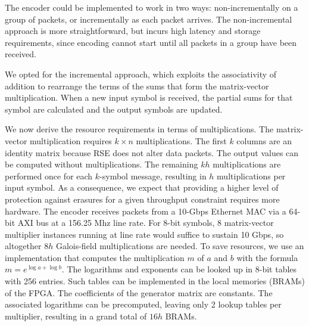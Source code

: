The encoder could be implemented to work in two ways:
non-incrementally on a group of packets, or incrementally as each
packet arrives. The non-incremental approach is more straightforward,
but incurs high latency and storage requirements, since  encoding
cannot start until all packets in a group have been received.

We opted for the incremental approach, which exploits the associativity of addition to
rearrange the terms of the sums that form the matrix-vector multiplication.
When a new input symbol is received, the partial sums for that symbol are
calculated and the output symbols are updated.

We now derive the resource requirements in terms of multiplications.
The matrix-vector multiplication requires $k \times n$
multiplications. %
The first $k$ columns are an identity matrix because RSE does not alter data
packets.  The output values can be computed without multiplications.  The
remaining $kh$ multiplications are performed once for each $k$-symbol message,
resulting in $h$ multiplications per input symbol.  As a consequence, we expect that
providing a higher level of protection against erasures for a given throughput
constraint requires more hardware.  The encoder receives
packets from a 10-Gbps Ethernet MAC via a 64-bit AXI bus at a 156.25 Mhz line
rate.  For 8-bit symbols, 8 matrix-vector multiplier instances running at
line rate would suffice to sustain 10 Gbps, so altogether $8h$ Galois-field multiplications
are needed.  To save resources, we use an implementation that computes the
multiplication $m$ of $a$ and $b$ with the formula $m = e^{\log a + \log b}$.
The logarithms and exponents can be looked up in 8-bit tables with 256
entries.
Such tables can be implemented in the local memories (BRAMs) of the FPGA.  
The coefficients of the generator matrix are constants.  The associated
logarithms can be precomputed, leaving only 2 lookup tables per multiplier,
resulting in a grand total of $16h$ BRAMs.

